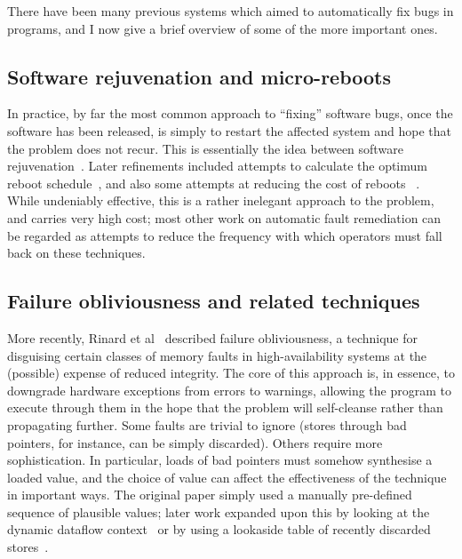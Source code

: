 There have been many previous systems which aimed to automatically fix
bugs in programs, and I now give a brief overview of some of the more
important ones.

\subsection{Software rejuvenation and micro-reboots}

In practice, by far the most common approach to ``fixing'' software
bugs, once the software has been released, is simply to restart the
affected system and hope that the problem does not recur.  This is
essentially the idea between software rejuvenation~\cite{Huang1995}.
Later refinements included attempts to calculate the optimum reboot
schedule~\cite{Garg1998,Li2002,Vaidyanathan2001}, and also some
attempts at reducing the cost of reboots
~\cite{Candea2002,Patterson2002}.  While undeniably effective, this is
a rather inelegant approach to the problem, and carries very high
cost; most other work on automatic fault remediation can be regarded
as attempts to reduce the frequency with which operators must fall
back on these techniques.

\subsection{Failure obliviousness and related techniques}
More recently, Rinard et al~\cite{Rinard2004} described failure
obliviousness, a technique for disguising certain classes of memory
faults in high-availability systems at the (possible) expense of
reduced integrity.  The core of this approach is, in essence, to
downgrade hardware exceptions from errors to warnings, allowing the
program to execute through them in the hope that the problem will
self-cleanse rather than propagating further.  Some faults are trivial
to ignore (stores through bad pointers, for instance, can be simply
discarded).  Others require more sophistication.  In particular, loads
of bad pointers must somehow synthesise a loaded value, and the choice
of value can affect the effectiveness of the technique in important
ways.  The original paper simply used a manually pre-defined sequence
of plausible values; later work expanded upon this by looking at the
dynamic dataflow context~\cite{Nagarajan2009} or by using a lookaside
table of recently discarded stores~\cite{Rinard2005a}.

